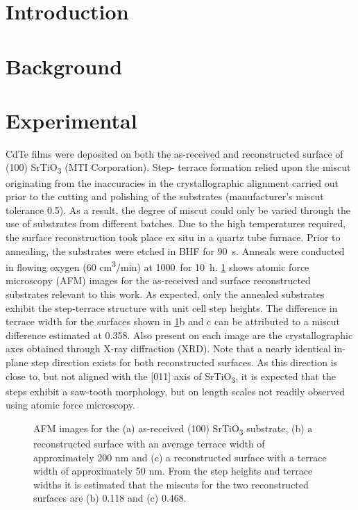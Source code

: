 \section{Introduction}
\section{Background}

\section{Experimental}
CdTe films were deposited on both the as-received and
reconstructed surface of (100) SrTiO\textsubscript{3} (MTI Corporation). Step-
terrace formation relied upon the miscut originating from the
inaccuracies in the crystallographic alignment carried out prior to
the cutting and polishing of the substrates (manufacturer’s miscut
tolerance 0.5\degree). As a result, the degree of miscut could only be
varied through the use of substrates from different batches. Due to
the high temperatures required, the surface reconstruction took
place ex situ in a quartz tube furnace. Prior to annealing, the
substrates were etched in BHF for 90~s. Anneals were conducted in
flowing oxygen (60 cm\textsuperscript{3}/min) at 1000\degree\celsius~for 10~h. \cref{fig:srtio3_sub_afm} shows
atomic force microscopy (AFM) images for the as-received and
surface reconstructed substrates relevant to this work. As
expected, only the annealed substrates exhibit the step-terrace
structure with unit cell step heights. The difference in terrace
width for the surfaces shown in \cref{fig:srtio3_sub_afm}b and c can be attributed to a
miscut difference estimated at 0.358\degree. Also present on each image
are the crystallographic axes obtained through X-ray diffraction
(XRD). Note that a nearly identical in-plane step direction exists for
both reconstructed surfaces. As this direction is close to, but not
aligned with the [011] axis of SrTiO\textsubscript{3}, it is expected that the steps
exhibit a saw-tooth morphology, but on length scales not readily
observed using atomic force microscopy.
\begin{figure}
    \centering
    \caption{\label{fig:srtio3_sub_afm}AFM images for the (a) as-received (100) SrTiO\textsubscript{3} substrate, (b) a reconstructed surface with an average terrace width of approximately 200 nm and (c) a reconstructed
        surface with a terrace width of approximately 50 nm. From the step heights and terrace widths it is estimated that the miscuts for the two reconstructed surfaces are (b) 0.118\degree
        and (c) 0.468\degree.}
\end{figure}

